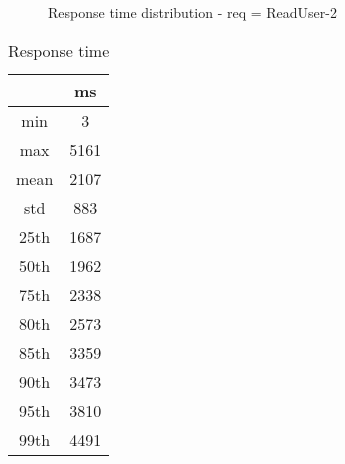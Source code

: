 \begin{minipage}{0.75\linewidth}
\begin{figure}[h]
\begin{adjustbox}{max width=1.0\linewidth, keepaspectratio}
  \end{adjustbox}
  \caption{Response time distribution - req = ReadUser-2}
\end{figure}
\end{minipage}\hfill\begin{minipage}{0.18\linewidth}
\begin{table}[h]
\begin{tabular}{|cc|}
\hline
\textbf{} & \textbf{ms}\\ \hline
 \Xhline{0.005\arrayrulewidth}
min & 3\\
 \Xhline{0.005\arrayrulewidth}
max & 5161\\
 \Xhline{0.005\arrayrulewidth}
mean & 2107\\
 \Xhline{0.005\arrayrulewidth}
std & 883\\
\hline
\hline
 \Xhline{0.005\arrayrulewidth}
25th & 1687\\
 \Xhline{0.005\arrayrulewidth}
50th & 1962\\
 \Xhline{0.005\arrayrulewidth}
75th & 2338\\
 \Xhline{0.005\arrayrulewidth}
80th & 2573\\
 \Xhline{0.005\arrayrulewidth}
85th & 3359\\
 \Xhline{0.005\arrayrulewidth}
90th & 3473\\
 \Xhline{0.005\arrayrulewidth}
95th & 3810\\
 \Xhline{0.005\arrayrulewidth}
99th & 4491\\
\hline
\end{tabular}
\caption{Response time}
\end{table}
\end{minipage}\hfill
